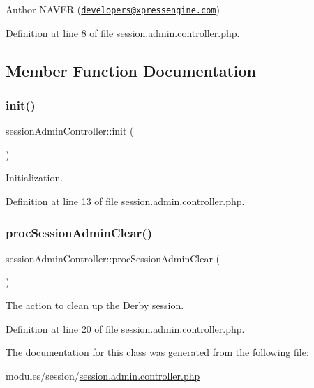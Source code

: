 \begin{DoxyAuthor}{Author}
N\+A\+V\+ER (\href{mailto:developers@xpressengine.com}{\tt developers@xpressengine.\+com}) 
\end{DoxyAuthor}


Definition at line 8 of file session.\+admin.\+controller.\+php.



\subsection{Member Function Documentation}
\hypertarget{classsessionAdminController_a9865e37281a061bded58fa3f00478ee5}{}\label{classsessionAdminController_a9865e37281a061bded58fa3f00478ee5} 
\subsubsection{\texorpdfstring{init()}{init()}}
{\footnotesize\ttfamily session\+Admin\+Controller\+::init (\begin{DoxyParamCaption}{ }\end{DoxyParamCaption})}



Initialization. 



Definition at line 13 of file session.\+admin.\+controller.\+php.

\hypertarget{classsessionAdminController_a502f604c9f27f92d5a6fb8e1c7409ca4}{}\label{classsessionAdminController_a502f604c9f27f92d5a6fb8e1c7409ca4} 
\subsubsection{\texorpdfstring{proc\+Session\+Admin\+Clear()}{procSessionAdminClear()}}
{\footnotesize\ttfamily session\+Admin\+Controller\+::proc\+Session\+Admin\+Clear (\begin{DoxyParamCaption}{ }\end{DoxyParamCaption})}



The action to clean up the Derby session. 



Definition at line 20 of file session.\+admin.\+controller.\+php.



The documentation for this class was generated from the following file\+:\begin{DoxyCompactItemize}
\item 
modules/session/\hyperlink{session_8admin_8controller_8php}{session.\+admin.\+controller.\+php}\end{DoxyCompactItemize}
